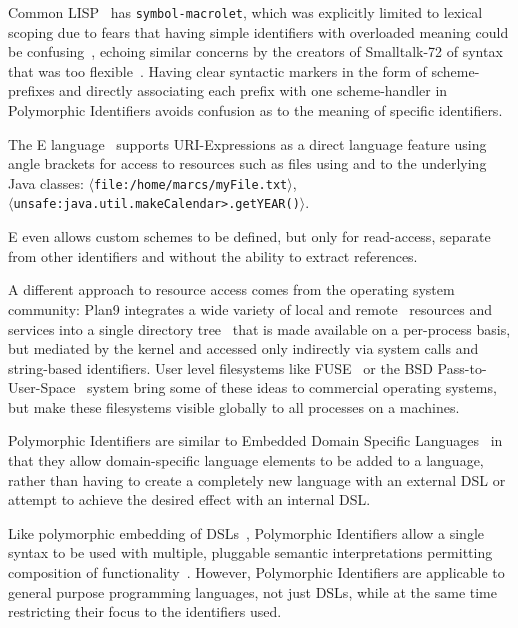 \documentclass[preprint]{sigplanconf}
\begin{document}
Common LISP~\cite{Steele:1990:CLL:95411} has {\tt symbol-macrolet}, which was explicitly limited to lexical scoping due to fears 
that having simple identifiers with overloaded meaning could be confusing~\cite{gabriel-lisp-identifiers}, echoing similar concerns by the creators
of Smalltalk-72 of syntax that was too flexible~\cite{Kay:1996:EHS:234286.1057828}.  Having clear syntactic markers in the form of scheme-prefixes
and directly associating each prefix with one scheme-handler in Polymorphic Identifiers avoids confusion as to the meaning of specific identifiers.

The E language~\cite{MillerRobustComposition}  supports URI-Expressions as a direct language feature using angle brackets for access to 
resources such as files using and to the underlying Java classes:   {\tt $\langle$file:/home/marcs/myFile.txt$\rangle$},  \\ {\tt $\langle$unsafe:java.util.makeCalendar>.getYEAR()$\rangle$}.

E even allows custom schemes to be defined, but  only for read-access, separate from other identifiers and without the ability to extract references.

A different approach to resource access comes from the operating system community:  Plan9 
integrates a wide variety of local and remote~\cite{plan9network} resources and services into a single directory tree~\cite{plan9names} that is made available on a per-process basis, but mediated by the kernel and accessed only indirectly via system calls and string-based
identifiers.
User level filesystems like FUSE~\cite{fuse} or the BSD Pass-to-User-Space~\cite{kantee:puffs} 
system bring some of these ideas to commercial operating systems, but make these filesystems visible globally to all
processes on a machines. 


Polymorphic Identifiers are similar to Embedded Domain Specific Languages~\cite{edsl}
in that they allow domain-specific language elements to be added to a language, rather
than having to create a completely new language with an external DSL or attempt to 
achieve the desired effect with an internal DSL\cite{fowlerdsl}.  

Like polymorphic embedding of DSLs~\cite{polydsl}, Polymorphic Identifiers allow
a single syntax to be used with multiple, pluggable semantic interpretations permitting
composition of functionality~\cite{embeddeddsl}.  However, Polymorphic Identifiers
are applicable to general purpose programming languages, not just DSLs, while
at the same time restricting their focus to the identifiers used.
\end{document}
